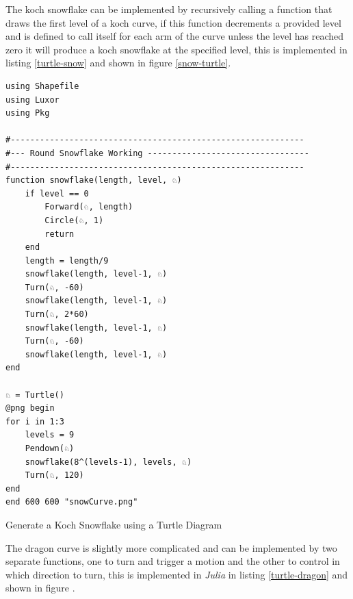 \documentclass[a4paper,11pt,twoside]{article}
\begin{document}
The koch snowflake can be implemented by recursively calling a function that draws the first level of a koch curve, if this function decrements a provided level and is defined to call itself for each arm of the curve unless the level has reached zero it will produce a koch snowflake at the specified level, this is implemented in listing \ref{turtle-snow} and shown in figure \ref{snow-turtle}.

\begin{listing}[htbp]
\begin{verbatim}
using Shapefile
using Luxor
using Pkg

#------------------------------------------------------------
#--- Round Snowflake Working ---------------------------------
#------------------------------------------------------------
function snowflake(length, level, ♘)
    if level == 0
        Forward(♘, length)
        Circle(♘, 1)
        return
    end
    length = length/9
    snowflake(length, level-1, ♘)
    Turn(♘, -60)
    snowflake(length, level-1, ♘)
    Turn(♘, 2*60)
    snowflake(length, level-1, ♘)
    Turn(♘, -60)
    snowflake(length, level-1, ♘)
end

♘ = Turtle()
@png begin
for i in 1:3
    levels = 9
    Pendown(♘)
    snowflake(8^(levels-1), levels, ♘)
    Turn(♘, 120)
end
end 600 600 "snowCurve.png"

\end{verbatim}
\caption{\label{turtle-snow}Generate a Koch Snowflake using a Turtle Diagram}
\end{listing}

The dragon curve is slightly more complicated and can be implemented by two separate functions, one to turn and trigger a motion and the other to control in which direction to turn, this is implemented in \emph{Julia} in listing \ref{turtle-dragon}  and shown in figure .
\end{document}
